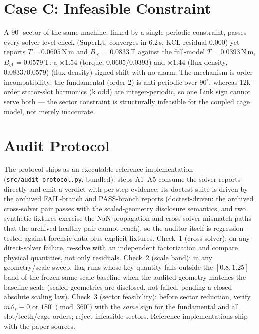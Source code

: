 \documentclass[preprint,12pt]{elsarticle}
\begin{document}
\section{Case C: Infeasible Constraint}\label{sec:caseC}
A $90^\circ$ sector of the same machine, linked by a single periodic
constraint, passes every solver-level check (SuperLU converges in
6.2\,s, KCL residual $0.000$) yet reports $T=0.0605$\,N\,m and
$B_{g1}=0.0833$\,T against the full-model $T=0.0393$\,N\,m,
$B_{g1}=0.0579$\,T: a $\times1.54$ (torque, $0.0605/0.0393$) and $\times1.44$
(flux density, $0.0833/0.0579$) (flux-density) signed shift with no alarm. The mechanism is order
incompatibility: the fundamental (order 2) is anti-periodic over
$90^\circ$, whereas 12k-order stator-slot harmonics (k odd) are
integer-periodic, so one Link sign cannot serve both --- the sector
constraint is structurally infeasible for the coupled cage model, not
merely inaccurate.
\section{Audit Protocol}
The protocol ships as an executable reference implementation
(\texttt{src/audit\_protocol.py}, bundled): steps A1--A5 consume the
solver reports directly and emit a verdict with per-step evidence; its
doctest suite is driven by the archived FAIL-branch and PASS-branch
reports (doctest-driven: the archived
cross-solver pair passes with the scaled-geometry disclosure semantics,
and two synthetic fixtures exercise the NaN-propagation and
cross-solver-mismatch paths that the archived healthy pair cannot
reach), so the auditor itself is regression-tested against forensic
data plus explicit fixtures.\label{sec:audit}
Check~1 (cross-solver): on any direct-solver failure, re-solve with an
independent factorization and compare physical quantities, not only
residuals. Check~2 (scale band): in any geometry/scale sweep, flag runs
whose key quantity falls outside the $[0.8, 1.25]$ band of the frozen
same-scale baseline when the audited geometry matches the baseline scale
(scaled geometries are disclosed, not failed, pending a closed absolute
scaling law). Check~3 (sector feasibility): before sector reduction, verify
$m\,\theta_s \equiv 0$ or $180^\circ \pmod{360^\circ}$ with the
\emph{same} sign for the fundamental and all slot/teeth/cage orders;
reject infeasible sectors. Reference implementations ship with the
paper sources.
\end{document}
